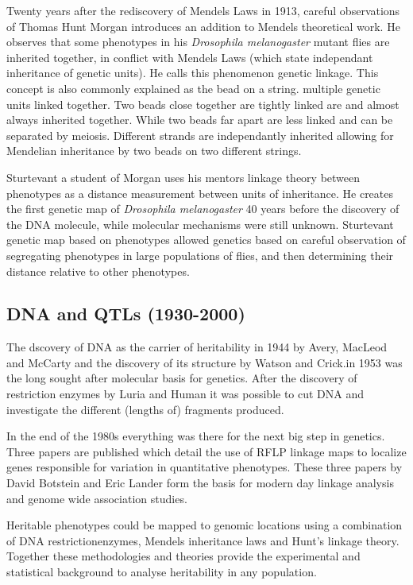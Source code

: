 Twenty years after the rediscovery of Mendels Laws in 1913, careful observations of 
Thomas Hunt Morgan introduces an addition to Mendels theoretical work. He observes 
that some phenotypes in his \emph{Drosophila melanogaster} mutant flies are inherited 
together, in conflict with Mendels Laws (which state independant inheritance of 
genetic units). He calls this phenomenon genetic linkage. This concept is also commonly 
explained as the bead on a string. multiple genetic units linked together. Two beads 
close together are tightly linked are and almost always inherited together. While 
two beads far apart are less linked and can be separated by meiosis. Different 
strands are independantly inherited allowing for Mendelian inheritance by two beads 
on two different strings.

Sturtevant a student of Morgan uses his mentors linkage theory between phenotypes 
as a distance measurement between units of inheritance. He creates the first genetic 
map of \emph{Drosophila melanogaster} 40 years before the discovery of the DNA molecule, 
while molecular mechanisms were still unknown. Sturtevant genetic map based on 
phenotypes allowed genetics based on careful observation of segregating phenotypes in 
large populations of flies, and then determining their distance relative to other 
phenotypes.

\subsection{DNA and QTLs (1930-2000)}

The dscovery of DNA as the carrier of heritability in 1944 by Avery, MacLeod and McCarty 
\cite{Avery:1944} and the discovery of its structure by Watson and Crick.in 1953 
\cite{Watson:1953} was the long sought after molecular basis for genetics. After the 
discovery of restriction enzymes by Luria and Human \cite{Luria:1952} it was possible 
to cut DNA and investigate the different (lengths of) fragments produced.

In the end of the 1980s everything was there for the next big step in genetics. Three 
papers are published which detail the use of RFLP linkage maps to localize genes 
responsible for variation in quantitative phenotypes. These three papers by David Botstein 
and Eric Lander \cite{Lander:1986, Lander:1987, Lander:1989} form the basis for modern 
day linkage analysis and genome wide association studies. 

Heritable phenotypes could be mapped to genomic locations using a combination of DNA 
restrictionenzymes, Mendels inheritance laws and Hunt's linkage theory. Together these 
methodologies and theories provide the experimental and statistical background to 
analyse heritability in any population.

